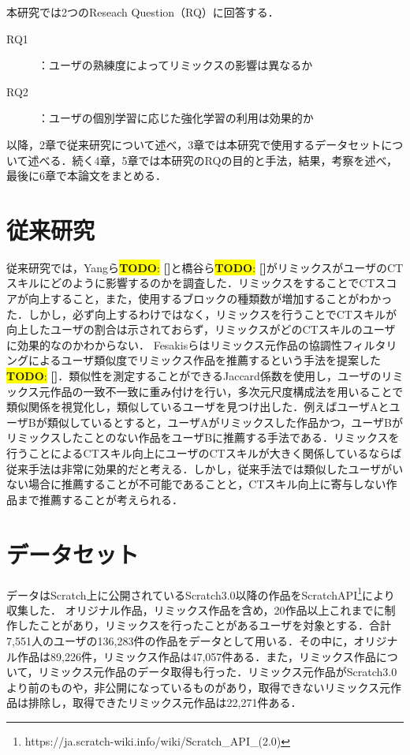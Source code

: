 \documentclass[submit,techrep,noauthor]{ipsj}
\newcommand{\todo}[1]{\colorbox{yellow}{{\bf TODO}:}{\color{red} {\textbf{[#1]}}}}
\begin{document}
本研究では2つのReseach Question（RQ）に回答する．

\begin{description}
  \item[RQ1]：ユーザの熟練度によってリミックスの影響は異なるか
  \item[RQ2]：ユーザの個別学習に応じた強化学習の利用は効果的か
\end{description}

以降，2章で従来研究について述べ，3章では本研究で使用するデータセットについて述べる．続く4章，5章では本研究のRQの目的と手法，結果，考察を述べ，最後に6章で本論文をまとめる．

\section{従来研究}
従来研究では，Yangら\todo{}と橋谷ら\todo{}がリミックスがユーザのCTスキルにどのように影響するのかを調査した．リミックスをすることでCTスコアが向上すること，また，使用するブロックの種類数が増加することがわかった．しかし，必ず向上するわけではなく，リミックスを行うことでCTスキルが向上したユーザの割合は示されておらず，リミックスがどのCTスキルのユーザに効果的なのかわからない．
Fesakisらはリミックス元作品の協調性フィルタリングによるユーザ類似度でリミックス作品を推薦するという手法を提案した\todo{}．類似性を測定することができるJaccard係数を使用し，ユーザのリミックス元作品の一致不一致に重み付けを行い，多次元尺度構成法を用いることで類似関係を視覚化し，類似しているユーザを見つけ出した．例えばユーザAとユーザBが類似しているとすると，ユーザAがリミックスした作品かつ，ユーザBがリミックスしたことのない作品をユーザBに推薦する手法である．リミックスを行うことによるCTスキル向上にユーザのCTスキルが大きく関係しているならば従来手法は非常に効果的だと考える．しかし，従来手法では類似したユーザがいない場合に推薦することが不可能であることと，CTスキル向上に寄与しない作品まで推薦することが考えられる．


\section{データセット}
データはScratch上に公開されているScratch3.0以降の作品をScratchAPI\footnote{https://ja.scratch-wiki.info/wiki/Scratch\_API\_(2.0)}により収集した．
オリジナル作品，リミックス作品を含め，20作品以上これまでに制作したことがあり，リミックスを行ったことがあるユーザを対象とする．合計7,551人のユーザの136,283件の作品をデータとして用いる．その中に，オリジナル作品は89,226件，リミックス作品は47,057件ある．また，リミックス作品について，リミックス元作品のデータ取得も行った．リミックス元作品がScratch3.0より前のものや，非公開になっているものがあり，取得できないリミックス元作品は排除し，取得できたリミックス元作品は22,271件ある．
\end{document}
